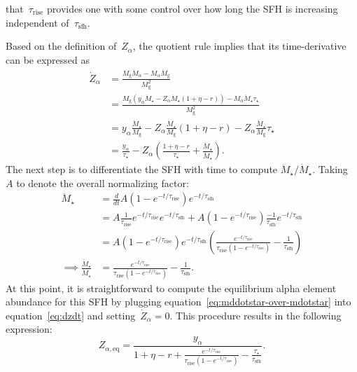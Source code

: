 \documentclass[12pt]{article}
\newcommand{\ddfrac}[2]{\frac{\displaystyle{#1}}{\displaystyle{#2}}}
\newcommand{\timescale}[1]{\ensuremath{\tau_\text{#1}}}
\begin{document}
that~$\timescale{rise}$ provides one with some control over how long the SFH is
increasing independent of~$\timescale{sfh}$.
\par
Based on the definition of~$Z_\alpha$, the quotient rule implies that its
time-derivative can be expressed as
\begin{subequations}\begin{align}
\dot{Z}_\alpha &= \frac{
	M_\text{g} \dot{M}_\alpha - M_\alpha \dot{M}_\text{g}
}{
	M_\text{g}^2
}
\\
&= \frac{
	M_\text{g} (y_\alpha \dot{M}_\star - Z_\alpha \dot{M}_\star (1 + \eta - r))
	- M_\alpha \ddot{M}_\star \tau_\star
}{
	M_\text{g}^2
}
\\
&= y_\alpha \frac{\dot{M}_\star}{M_\text{g}} -
Z_\alpha \frac{\dot{M}_\star}{M_\text{g}}(1 + \eta - r) -
Z_\alpha \frac{\ddot{M}_\star}{M_\text{g}} \tau_\star
\\
&= \frac{y_\alpha}{\tau_\star} -
Z_\alpha \left(\frac{1 + \eta - r}{\tau_\star} +
\frac{\ddot{M}_\star}{\dot{M}_\star}\right).
\label{eq:dzdt}
\end{align}\end{subequations}
The next step is to differentiate the SFH with time to compute
$\ddot{M}_\star / \dot{M}_\star$. Taking~$A$ to denote the overall normalizing
factor:
\begin{subequations}\begin{align}
\ddot{M}_\star &= \frac{d}{dt}
A(1 - e^{-t / \timescale{rise}}) e^{-t / \timescale{sfh}}
\\
&= A \frac{1}{\timescale{rise}}e^{-t / \timescale{rise}}
e^{-t / \timescale{sfh}} +
A(1 - e^{-t / \timescale{rise}}) \frac{-1}{\timescale{sfh}}
e^{-t / \timescale{sfh}}
\\
&= A(1 - e^{-t / \timescale{rise}})e^{-t / \timescale{sfh}}
\left(\frac{
	e^{-t / \timescale{rise}}
}{
	\timescale{rise}(1 - e^{-t / \timescale{rise}})
} - \frac{1}{\timescale{sfh}}
\right)
\\
\implies \frac{\ddot{M}_\star}{\dot{M}_\star} &= \frac{
	e^{-t / \timescale{rise}}
}{
	\timescale{rise}(1 - e^{-t / \timescale{rise}})
} - \frac{1}{\timescale{sfh}}.
\label{eq:mddotstar-over-mdotstar}
\end{align}\end{subequations}
At this point, it is straightforward to compute the equilibrium alpha element
abundance for this SFH by plugging equation~\ref{eq:mddotstar-over-mdotstar}
into equation~\ref{eq:dzdt} and setting~$\dot{Z}_\alpha = 0$.
This procedure results in the following expression:
\begin{equation}
Z_{\alpha,\text{eq}} = \ddfrac{
	y_\alpha
}{
	1 + \eta - r + \frac{
		e^{-t / \timescale{rise}}
	}{
		\timescale{rise}(1 - e^{-t / \timescale{rise}})
	} - \frac{\tau_\star}{\timescale{sfh}}
}.
\label{eq:zalpha-eq}
\end{equation}
\end{document}
